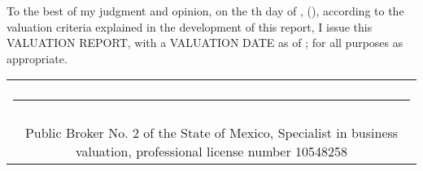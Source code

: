 To the best of my judgment and opinion, on the \textcolor{principal}{\diainforme th day of \monthname[\mesinforme]{}, \annoinforme{} (\numberstringnum{\annoinforme})}, according to the valuation criteria explained in the development of this report, I issue this VALUATION REPORT, with a VALUATION DATE as of \fechaValores; for all purposes as appropriate.\\



\begin{table}[H]
\centering
	\begin{tabular}{c}
	\begin{minipage}{7cm}
	\begin{center}
		``APPRAISER''\\[1cm]
		
		\rule{7cm}{.4pt}\\
		\nombrePerito\\
		\textcolor{principal}{Public Broker No. 2 of the State of Mexico, Specialist in business valuation, professional license number 10548258
		}
		
	\end{center}
	\end{minipage}
	
	\end{tabular}
\end{table}
